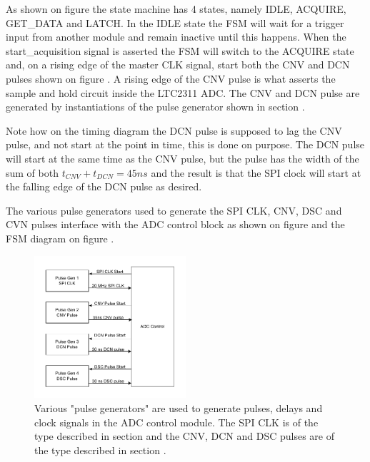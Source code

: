 As shown on figure  the state machine has 4 states, namely IDLE, ACQUIRE, GET\_DATA and LATCH. In the IDLE state the FSM will wait for a trigger input from another module and remain inactive until this happens. When the start\_acquisition signal is asserted the FSM will switch to the ACQUIRE state and, on a rising edge of the master CLK signal, start both the CNV and DCN pulses shown on figure . A rising edge of the CNV pulse is what asserts the sample and hold circuit inside the LTC2311 ADC. The CNV and DCN pulse are generated by instantiations of the pulse generator shown in section .

Note how on the timing diagram the DCN pulse is supposed to lag the CNV pulse, and not start at the point in time, this is done on purpose. The DCN pulse will start at the same time as the CNV pulse, but the pulse has the width of the sum of both $t_{CNV} + t_{DCN} = 45 ns$ and the result is that the SPI clock will start at the falling edge of the DCN pulse as desired.  

The various pulse generators used to generate the SPI CLK, CNV, DSC and CVN pulses interface with the ADC control block as shown on figure  and the FSM diagram on figure .

\begin{figure}[H]
    \centering
    \includegraphics[clip, trim=0 15 0 0, width=0.5\textwidth]{Sections/7_SystemDesign/Figures/7_2_8_PulseAndADCControl.pdf}
    \caption{Various "pulse generators" are used to generate pulses, delays and clock signals in the ADC control module. The SPI CLK is of the type described in section  and the CNV, DCN and DSC pulses are of the type described in section .}
    \label{fig:7_2_8_PULSE_DELAY_TIMING}
\end{figure}

